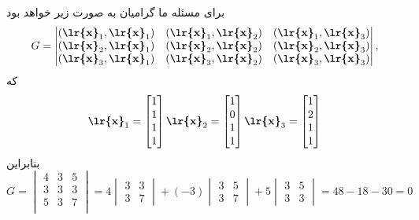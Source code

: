 \documentclass[a4paper,12pt]{report}
\begin{document}
  	   برای مسئله ما گرامیان به صورت زیر خواهد بود
  	   $$
  	   G=
  	   \begin{vmatrix}
	  	   	(\textbf{\lr{x}}_1,\textbf{\lr{x}}_1) & 
	  	   	(\textbf{\lr{x}}_1,\textbf{\lr{x}}_2) &
	  	   	(\textbf{\lr{x}}_1,\textbf{\lr{x}}_3) \\
	  	   	(\textbf{\lr{x}}_2,\textbf{\lr{x}}_1) &
	  	   	(\textbf{\lr{x}}_2,\textbf{\lr{x}}_2) &
	  	   	(\textbf{\lr{x}}_2,\textbf{\lr{x}}_3) \\
	  	   	(\textbf{\lr{x}}_3,\textbf{\lr{x}}_1) &
	  	   	(\textbf{\lr{x}}_3,\textbf{\lr{x}}_2) &
	  	   	(\textbf{\lr{x}}_3,\textbf{\lr{x}}_3)
  	   \end{vmatrix},
       $$
       که
       $$
       \textbf{\lr{x}}_1=
       \begin{bmatrix}
	       	1 \\ 1 \\ 1 \\ 1
       \end{bmatrix}
   	   \textbf{\lr{x}}_2=
   	   \begin{bmatrix}
   	   	1 \\ 0 \\ 1 \\ 1
   	   \end{bmatrix}
       \textbf{\lr{x}}_3=
       \begin{bmatrix}
       	1 \\ 2 \\ 1 \\ 1
       \end{bmatrix}
  	   $$
  	   بنابراین
  	   $$
  	   G=
  	   \begin{vmatrix}
	  	   	4 & 3 & 5 \\
	  	   	3 & 3 & 3 \\
	  	   	5 & 3 & 7 \\	  	   	
  	   \end{vmatrix}
       =4
       \begin{vmatrix}
	       	3 & 3 \\
	       	3 & 7
       \end{vmatrix}
   	   +(-3)
   	   \begin{vmatrix}
	   	   	3 & 5 \\
	   	   	3 & 7
   	   \end{vmatrix}
       +5
       \begin{vmatrix}
	       	3 & 5 \\
	       	3 & 3
       \end{vmatrix}
   	   =48-18-30=0
  	   $$
\end{document}
